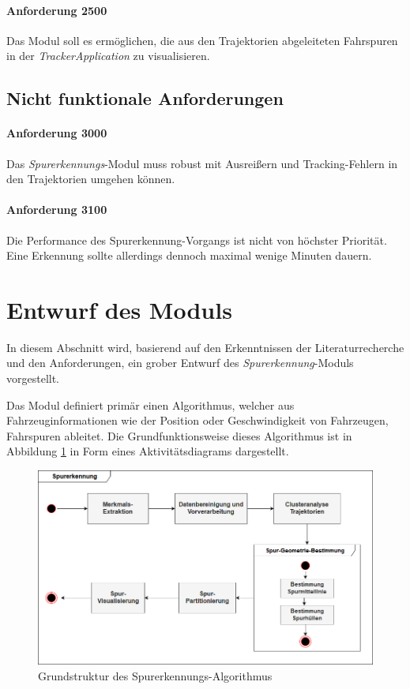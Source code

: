 \paragraph{Anforderung 2500}
Das Modul soll es ermöglichen, die aus den Trajektorien abgeleiteten Fahrspuren in der \textit{TrackerApplication}
zu visualisieren.

\subsection{Nicht funktionale Anforderungen}

\paragraph{Anforderung 3000}
Das \textit{Spurerkennungs}-Modul muss robust mit Ausreißern und Tracking-Fehlern in den Trajektorien umgehen können.

\paragraph{Anforderung 3100}
Die Performance des Spurerkennung-Vorgangs ist nicht von höchster Priorität. Eine Erkennung sollte allerdings
dennoch maximal wenige Minuten dauern.


\section{Entwurf des Moduls}
\label{sec:design}

In diesem Abschnitt wird, basierend auf den Erkenntnissen der Literaturrecherche und den Anforderungen,
ein grober Entwurf des \textit{Spurerkennung}-Moduls vorgestellt.

Das Modul definiert primär einen Algorithmus, welcher aus Fahrzeuginformationen wie der Position
oder Geschwindigkeit von Fahrzeugen, Fahrspuren ableitet. Die Grundfunktionsweise dieses Algorithmus
ist in Abbildung \ref{fig:concept_laneDetection_activity} in Form eines Aktivitätsdiagrams dargestellt.

\begin{figure}[H]
    \centering
    \includegraphics[width=0.8\linewidth]{resources/img/konzeption/activity_laneDetection}
    \caption{Grundstruktur des Spurerkennungs-Algorithmus}
    \label{fig:concept_laneDetection_activity}
\end{figure}

